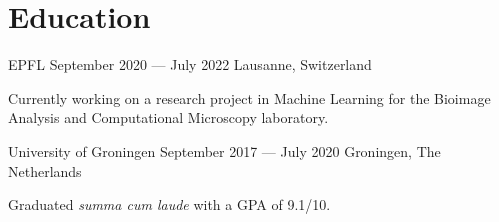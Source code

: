 \section*{Education}

\begin{cventries}
{EPFL} %
{September 2020 --- July 2022} %
{Lausanne, Switzerland} %
{%
  \begin{cvitems}
    \item Currently working on a research project in Machine Learning for the Bioimage Analysis and Computational Microscopy laboratory.
  \end{cvitems}
}
{University of Groningen}  %
{September 2017 --- July 2020} %
{Groningen, The Netherlands} %
{%
  \begin{cvitems}
    \item Graduated \textit{summa cum laude} with a GPA of 9.1/10.
  \end{cvitems}
}
\end{cventries}
